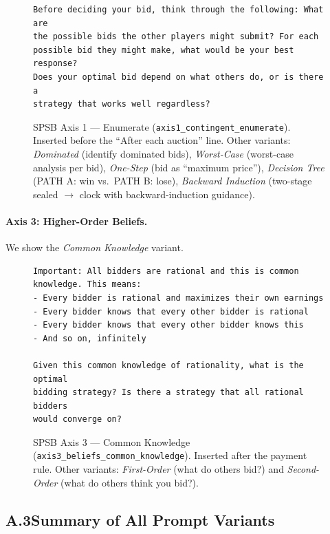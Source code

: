\begin{figure}[H]
\begin{lstlisting}
Before deciding your bid, think through the following: What are
the possible bids the other players might submit? For each
possible bid they might make, what would be your best response?
Does your optimal bid depend on what others do, or is there a
strategy that works well regardless?
\end{lstlisting}
\caption{SPSB Axis 1 --- Enumerate (\texttt{axis1\_contingent\_enumerate}). Inserted before the ``After each auction'' line. Other variants: \emph{Dominated} (identify dominated bids), \emph{Worst-Case} (worst-case analysis per bid), \emph{One-Step} (bid as ``maximum price''), \emph{Decision Tree} (PATH A: win vs.\ PATH B: lose), \emph{Backward Induction} (two-stage sealed $\to$ clock with backward-induction guidance).}
\label{fig:auction-axis1-enumerate}
\end{figure}

\paragraph{Axis 3: Higher-Order Beliefs.}
We show the \emph{Common Knowledge} variant.

\begin{figure}[H]
\begin{lstlisting}
Important: All bidders are rational and this is common
knowledge. This means:
- Every bidder is rational and maximizes their own earnings
- Every bidder knows that every other bidder is rational
- Every bidder knows that every other bidder knows this
- And so on, infinitely

Given this common knowledge of rationality, what is the optimal
bidding strategy? Is there a strategy that all rational bidders
would converge on?
\end{lstlisting}
\caption{SPSB Axis 3 --- Common Knowledge (\texttt{axis3\_beliefs\_common\_knowledge}). Inserted after the payment rule. Other variants: \emph{First-Order} (what do others bid?) and \emph{Second-Order} (what do others think you bid?).}
\label{fig:auction-axis3-common-knowledge}
\end{figure}



\subsection*{A.3\quad Summary of All Prompt Variants}

